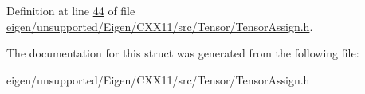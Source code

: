 Definition at line \hyperlink{eigen_2unsupported_2_eigen_2_c_x_x11_2src_2_tensor_2_tensor_assign_8h_source_l00044}{44} of file \hyperlink{eigen_2unsupported_2_eigen_2_c_x_x11_2src_2_tensor_2_tensor_assign_8h_source}{eigen/unsupported/\+Eigen/\+C\+X\+X11/src/\+Tensor/\+Tensor\+Assign.\+h}.



The documentation for this struct was generated from the following file\+:\begin{DoxyCompactItemize}
\item 
eigen/unsupported/\+Eigen/\+C\+X\+X11/src/\+Tensor/\+Tensor\+Assign.\+h\end{DoxyCompactItemize}
